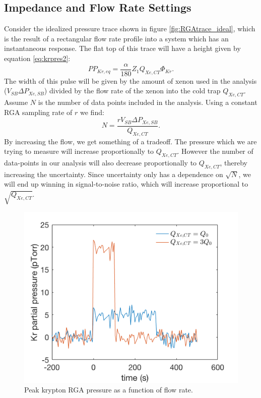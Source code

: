 \subsection{Impedance and Flow Rate Settings}
Consider the idealized pressure trace shown in figure \ref{fig:RGAtrace_ideal}, which is the result of a rectangular flow rate profile into a system which has an instantaneous response. The flat top of this trace will have a height given by equation \ref{eq:krpres2}:
\begin{equation}
PP_{Kr,eq}=\frac{\alpha}{180}Z_{1}Q_{Xe,CT}\Phi_{Kr}.
\end{equation}
The width of this pulse will be given by the amount of xenon used in the analysis ($V_{SB}\Delta P_{Xe,SB}$) divided by the flow rate of the xenon into the cold trap $Q_{Xe,CT}$.  Assume $N$ is the number of data points included in the analysis. Using a constant RGA sampling rate of $r$ we find: 
\begin{equation}
N=\frac{rV_{SB}\Delta P_{Xe,SB}}{Q_{Xe,CT}}.
\end{equation}
By increasing the flow, we get something of a tradeoff. The pressure which we are trying to measure will increase proportionally to $Q_{Xe,CT}$. However the number of data-points in our analysis will also decrease proportionally to $Q_{Xe,CT}$, thereby increasing the uncertainty. Since uncertainty only has a dependence on $\sqrt{N}$, we will end up winning in signal-to-noise ratio, which will increase proportional to $\sqrt{Q_{Xe,CT}}$. 
\begin{figure}[h]
  \includegraphics[width=\linewidth]{Figures/RGAtrace_ideal.png}
  \caption{Peak krypton RGA pressure as a function of flow rate.  }
  \label{fig:flowresponse1x}
\end{figure}

